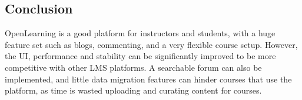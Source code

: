 \subsection{Conclusion}
OpenLearning is a good platform for instructors and students, with a huge feature set such as blogs, commenting, and a very flexible course setup. However, the UI, performance and stability can be significantly improved to be more competitive with other LMS platforms. A searchable forum can also be implemented, and little data migration features can hinder courses that use the platform, as time is wasted uploading and curating content for courses.

